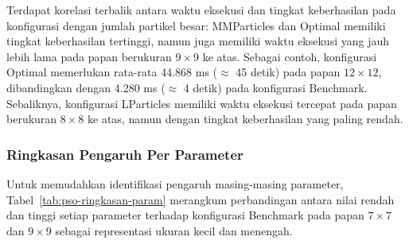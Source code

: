 Terdapat korelasi terbalik antara waktu eksekusi dan tingkat keberhasilan pada konfigurasi dengan jumlah partikel besar: MMParticles dan Optimal memiliki tingkat keberhasilan tertinggi, namun juga memiliki waktu eksekusi yang jauh lebih lama pada papan berukuran $9 \times 9$ ke atas. Sebagai contoh, konfigurasi Optimal memerlukan rata-rata 44.868 ms ($\approx$ 45 detik) pada papan $12 \times 12$, dibandingkan dengan 4.280 ms ($\approx$ 4 detik) pada konfigurasi Benchmark. Sebaliknya, konfigurasi LParticles memiliki waktu eksekusi tercepat pada papan berukuran $8 \times 8$ ke atas, namun dengan tingkat keberhasilan yang paling rendah.

\subsubsection{Ringkasan Pengaruh Per Parameter}

Untuk memudahkan identifikasi pengaruh masing-masing parameter, Tabel~\ref{tab:pso-ringkasan-param} merangkum perbandingan antara nilai rendah dan tinggi setiap parameter terhadap konfigurasi Benchmark pada papan $7 \times 7$ dan $9 \times 9$ sebagai representasi ukuran kecil dan menengah.

